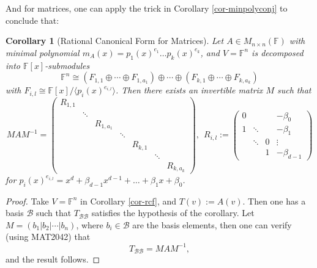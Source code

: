 \documentclass[11pt,openany]{book}
\theoremstyle{plain}
\newtheorem{corollary}[corollary]{Corollary}
\theoremstyle{definition}
\theoremstyle{remark}
\begin{document}
And for matrices, one can apply the trick in Corollary \ref{cor-minpolyconj} to conclude that:
\begin{corollary}[Rational Canonical Form for Matrices]
Let $A \in M_{n\times n}(\mathbb{F})$ with minimal polynomial
$m_A(x) = p_1(x)^{e_1} \dots p_k(x)^{e_k}$, and $V = \mathbb{F}^n$ is decomposed into $\mathbb{F}[x]$-submodules
$$\mathbb{F}^n \cong (F_{1,1} \oplus \cdots \oplus F_{1,a_1}) \oplus \cdots \oplus (F_{k,1} \oplus \cdots \oplus F_{k,a_k})$$
with $F_{i,l} \cong \mathbb{F}[x]/\langle p_i(x)^{e_{i,l}} \rangle$. Then there exists an invertible matrix $M$ such that 
    $$MAM^{-1} = \begin{pmatrix} R_{1,1} & & & & & \\
& \ddots & & & & & \\ 
& & R_{1,a_1} & & & & \\
& & & \ddots & & &\\
& & & & R_{k,1} & & \\
& & & & & \ddots & \\
& & & & & & R_{k,a_k}\end{pmatrix},\ \ R_{i,l} := \begin{pmatrix}
    0 &  &  &  -\beta_0 \\
    1 & \ddots     & &   -\beta_1 \\
    & \ddots & 0 &  \vdots \\ 
     &  & 1 & -\beta_{d-1}
\end{pmatrix}
$$
for $p_i(x)^{e_{i,l}} = x^d + \beta_{d-1}x^{d-1}+ \dots + \beta_1 x + \beta_0$.    
\end{corollary}
\begin{proof}
    Take $V = \mathbb{F}^n$ in Corollary \ref{cor-rcf}, and $T(v) := A(v)$. Then one has a basis $\mathcal{B}$ such that $T_{\mathcal{B}\mathcal{B}}$ satisfies the hypothesis of the corollary. Let $M = (b_1|b_2|\cdots|b_n)$, where $b_i \in \mathcal{B}$ are the basis elements, then one can verify (using MAT2042) that
    $$T_{\mathcal{B}\mathcal{B}} = MAM^{-1},$$
    and the result follows.
\end{proof}
\end{document}

